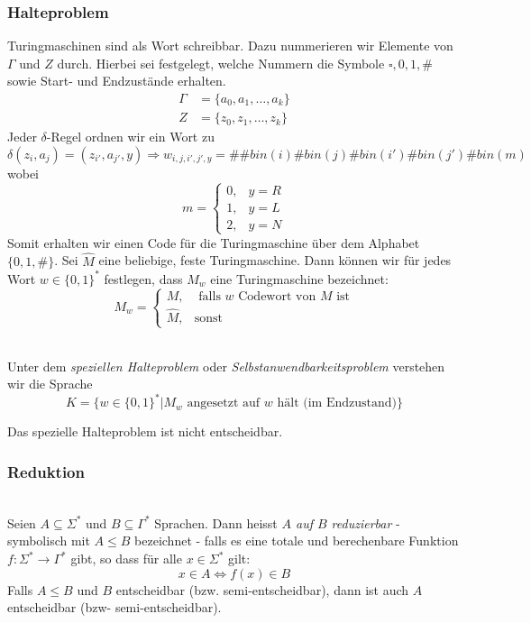 \documentclass{scrartcl}
\begin{document}
\subsubsection*{Halteproblem}
Turingmaschinen sind als Wort schreibbar. Dazu nummerieren wir Elemente von $\Gamma$ und $Z$ durch. Hierbei sei festgelegt, welche Nummern die Symbole $\square,0,1,\#$ sowie Start- und Endzustände erhalten.
\begin{align*}
\Gamma &= \{a_0,a_1,\dots,a_k\} \\
Z &= \{z_0,z_1,\dots,z_k\}
\end{align*}
Jeder $\delta$-Regel ordnen wir ein Wort zu
\[
\delta(z_i,a_j) = (z_{i'},a_{j'},y)
\Rightarrow w_{i,j,i',j',y} = \#\#bin(i)\#bin(j)\#bin(i')\#bin(j')\#bin(m)
\]
wobei
\[
m=
\begin{cases}
    0, & y=R \\
    1, & y=L \\
    2, & y=N
\end{cases}
\]
Somit erhalten wir einen Code für die Turingmaschine über dem Alphabet $\{0,1,\#\}$. Sei $\hat M$ eine beliebige, feste Turingmaschine. Dann können wir für jedes Wort $w\in\{0,1\}^*$ festlegen, dass $M_w$ eine Turingmaschine bezeichnet:
\[
M_w=
\begin{cases}
    M, &\text{ falls } w \textrm{ Codewort von } M \textrm{ ist}\\
    \hat M, & \textrm{sonst}
\end{cases}
\]

\begin{shaded}
    \ \\Unter dem \emph{speziellen Halteproblem} oder \emph{Selbstanwendbarkeitsproblem} verstehen wir die Sprache
    \[ K=\{w\in\{0,1\}^* | M_w \textrm{ angesetzt auf } w \textrm{ hält (im Endzustand)}\} \]
\end{shaded}

\begin{shaded}
    Das spezielle Halteproblem ist nicht entscheidbar.
\end{shaded}

\subsubsection*{Reduktion}
\begin{shaded}
    \ \\Seien $A\subseteq\Sigma^*$ und $B\subseteq\Gamma^*$ Sprachen. Dann heisst \emph{$A$ auf $B$ reduzierbar} - symbolisch mit $A\leq B$ bezeichnet - falls es eine totale und berechenbare Funktion $f:\Sigma^*\to\Gamma^*$ gibt, so dass für alle $x\in\Sigma^*$ gilt:
    \[ x\in A \Longleftrightarrow f(x)\in B \]
    Falls $A\leq B$ und $B$ entscheidbar (bzw. semi-entscheidbar), dann ist auch $A$ entscheidbar (bzw- semi-entscheidbar).
\end{shaded}
\end{document}
